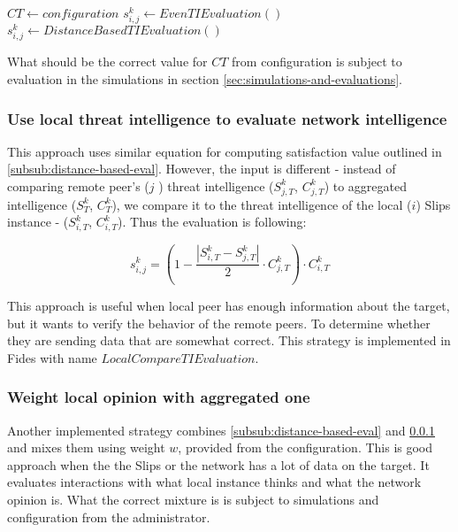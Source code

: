 \begin{algorithm}
\caption{$ThresholdTIEvaluation$}\label{alg:threshold-ti-evaluation}
\begin{algorithmic}[1]
\State ${CT} \gets configuration$ 
	\State $s^{k}_{i, j} \gets EvenTIEvaluation()$
\Else
    \State $s^{k}_{i, j} \gets DistanceBasedTIEvaluation()$
\EndIf
\end{algorithmic}
\end{algorithm}

\noindent What should be the correct value for $CT$ from configuration is subject to evaluation in the simulations in section \ref{sec:simulations-and-evaluations}.

\subsubsection{Use local threat intelligence to evaluate network intelligence}
\label{subsub:use-local-threat-to-evaluate}
This approach uses similar equation for computing satisfaction value outlined in \ref{subsub:distance-based-eval}. However, the input is different - instead of comparing remote peer's ($j$ ) threat intelligence ($S^{k}_{j, T}$, $C^{k}_{j, T}$) to aggregated intelligence ($S^{k}_{T}$, $C^{k}_{T}$), we compare it to the threat intelligence of the local ($i$) Slips instance - ($S^{k}_{i, T}$, $C^{k}_{i, T}$). Thus the evaluation is following:

\begin{equation}
s^{k}_{i, j} = \left(1 - \frac{|{S}^{k}_{i, T} - S^{k}_{j, T}|}{2} \cdot C^{k}_{j, T}\right) \cdot C^{k}_{i, T}
\end{equation}

This approach is useful when local peer has enough information about the target, but it wants to verify the behavior of the remote peers.
To determine whether they are sending data that are somewhat correct. This strategy is implemented in Fides with name $LocalCompareTIEvaluation$.

\subsubsection{Weight local opinion with aggregated one}
Another implemented strategy combines \ref{subsub:distance-based-eval} and \ref{subsub:use-local-threat-to-evaluate} and mixes them using weight $w$, provided from the configuration.
This is good approach when the the Slips or the network has a lot of data on the target. It evaluates interactions with what local instance thinks and what the network opinion is.
What the correct mixture is is subject to simulations and configuration from the administrator.

